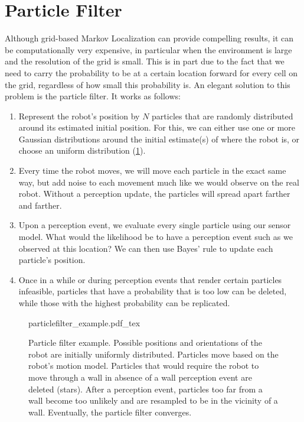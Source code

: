 \section{Particle Filter}
Although grid-based Markov Localization can provide compelling results, it can be computationally very expensive, in particular when the environment is large and the resolution of the grid is small. This is in part due to the fact that we need to carry the probability to be at a certain location forward for every cell on the grid, regardless of how small this probability is. An elegant solution to this problem is the particle filter. It works as follows:
\begin{enumerate}
\item Represent the robot's position by $N$ particles that are randomly distributed around its estimated initial position. For this, we can either use one or more Gaussian distributions around the initial estimate(s) of where the robot is, or choose an uniform distribution (\cref{fig:particlefilter_example}).
\item Every time the robot moves, we will move each particle in the exact same way, but add noise to each movement much like we would observe on the real robot. Without a perception update, the particles will spread apart farther and farther.
\item Upon a perception event, we evaluate every single particle using our sensor model. What would the likelihood be to have a perception event such as we observed at this location? We can then use Bayes' rule to update each particle's position.
\item Once in a while or during perception events that render certain particles infeasible, particles that have a probability that is too low can be deleted, while those with the highest probability can be replicated.
\end{enumerate}

\begin{figure}[!htb]
	\centering
    \def\svgwidth{0.92\textwidth}
    {particlefilter_example.pdf_tex}
	\caption{Particle filter example. Possible positions and orientations of the robot are initially uniformly distributed. Particles move based on the robot's motion model. Particles that would require the robot to move through a wall in absence of a wall perception event are deleted (stars). After a perception event, particles too far from a wall become too unlikely and are resampled to be in the vicinity of a wall. Eventually, the particle filter converges.
	\label{fig:particlefilter_example}}
\end{figure}


